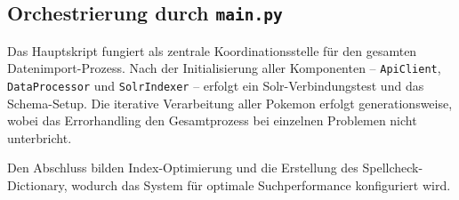 \subsection{Orchestrierung durch \texttt{main.py}}

Das Hauptskript fungiert als zentrale Koordinationsstelle für den gesamten Datenimport-Prozess. Nach der Initialisierung aller Komponenten -- \texttt{ApiClient}, \texttt{DataProcessor} und \texttt{SolrIndexer} -- erfolgt ein Solr-Verbindungstest und das Schema-Setup. Die iterative Verarbeitung aller Pokemon erfolgt generationsweise, wobei das Errorhandling den Gesamtprozess bei einzelnen Problemen nicht unterbricht.

Den Abschluss bilden Index-Optimierung und die Erstellung des Spellcheck-Dictionary, wodurch das System für optimale Suchperformance konfiguriert wird.



